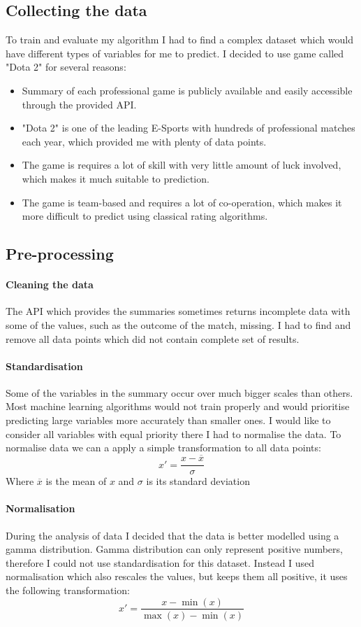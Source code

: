 \documentclass[12pt,a4paper]{book}
\newcommand\mean[1]{\overline{#1}}
\begin{document}
\subsection{Collecting the data}
To train and evaluate my algorithm I had to find a complex dataset which would have different types of variables for me to predict.
I decided to use game called "Dota 2" for several reasons:
\begin{itemize}
\item Summary of each professional game is publicly available and easily accessible through the provided API.
\item "Dota 2" is one of the leading E-Sports with hundreds of professional matches each year, which provided me with plenty of data points.
\item The game is requires a lot of skill with very little amount of luck involved, which makes it much suitable to prediction.
\item The game is team-based and requires a lot of co-operation, which makes it more difficult to predict using classical rating algorithms.
\end{itemize}
\subsection{Pre-processing}
\paragraph{Cleaning the data}
The API which provides the summaries sometimes returns incomplete data with some of the values, such as the outcome of the match, missing.
I had to find and remove all data points which did not contain complete set of results.
\paragraph{Standardisation}
Some of the variables in the summary occur over much bigger scales than others.
Most machine learning algorithms would not train properly and would prioritise predicting large variables more accurately than smaller ones.
I would like to consider all variables with equal priority there I had to normalise the data.
To normalise data we can a apply a simple transformation to all data points:
\begin{equation}
x' = \frac{x - \mean{x}}{\sigma}
\end{equation}
Where $\mean{x}$ is the mean of $x$ and $\sigma$ is its standard deviation
\paragraph{Normalisation}
During the analysis of data I decided that the data is better modelled using a gamma distribution.
Gamma distribution can only represent positive numbers, therefore I could not use standardisation for this dataset.
Instead I used normalisation which also rescales the values, but keeps them all positive, it uses the following transformation:
\begin{equation}
x' = \frac{x - \min(x)}{\max(x)-\min(x)}
\end{equation}
\end{document}
